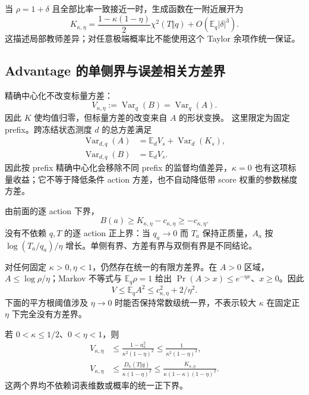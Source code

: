 \documentclass[lang=cn,scheme=chinese,openany]{../book/elegantbook}
\newcommand{\E}{\mathbb E}
\newcommand{\Var}{\operatorname{Var}}
\begin{document}
当 $\rho=1+\delta$ 且全部比率一致接近一时，生成函数在一附近展开为
\begin{equation}
 K_{\kappa,\eta}
 =\frac{1-\kappa(1-\eta)}2\chi^2(T\Vert q)
  +O(\E_q|\delta|^3).
\end{equation}
这描述局部教师差异；对任意极端概率比不能使用这个 Taylor 余项作统一保证。
\subsection{Advantage 的单侧界与误差相关方差界}

精确中心化不改变标量方差：
\begin{equation}
 V_{\kappa,\eta}:=\Var_q(B)=\Var_q(A).
\end{equation}
因此 $K$ 使均值归零，但标量方差的改变来自 $A$ 的形状变换。 这里限定为固定 prefix。跨冻结状态测度 $d$ 的总方差满足
\begin{align}
 \Var_{d,q}(A)&=\E_dV_s+\Var_d(K_s),\\
 \Var_{d,q}(B)&=\E_dV_s.
\end{align}
因此按 prefix 精确中心化会移除不同 prefix 的监督均值差异，$\kappa=0$ 也有这项标量收益；它不等于降低条件 action 方差，也不自动降低带 score 权重的参数梯度方差。

由前面的逐 action 下界，
\begin{equation}
 B(a)\ge K_{\kappa,\eta}-c_{\kappa,\eta}\ge-c_{\kappa,\eta}.
\end{equation}
没有不依赖 $q,T$ 的逐 action 正上界：当 $q_a\to0$ 而 $T_a$ 保持正质量，$A_a$ 按 $\log(T_a/q_a)/\eta$ 增长。单侧有界、方差有界与双侧有界是不同结论。

对任何固定 $\kappa>0,\eta<1$，仍然存在统一的有限方差界。在 $A>0$ 区域，$A\le\log\rho/\eta$；Markov 不等式与 $\E_q\rho=1$ 给出 $\Pr(A>x)\le e^{-\eta x}$、$x\ge0$。因此
\begin{equation}
 V\le\E_qA^2\le c_{\kappa,\eta}^2+2/\eta^2.
\end{equation}
下面的平方根阈值涉及 $\eta\to0$ 时能否保持常数级统一界，不表示较大 $\kappa$ 在固定正 $\eta$ 下完全没有方差界。

\begin{theorem}
\label{thm:center-advantage-variance}
若 $0<\kappa\le1/2$、$0<\eta<1$，则
\begin{align}
 V_{\kappa,\eta}
 &\le\frac{1-a_\kappa^2}{\kappa^2(1-\eta)^2}
 \le\frac1{\kappa^2(1-\eta)^2},\\
 V_{\kappa,\eta}
 &\le\frac{D_\kappa(T\Vert q)}{\kappa(1-\eta)^2}
 \le\frac{K_{\kappa,\eta}}{\kappa(1-\kappa)(1-\eta)^2}.
 \label{eq:center-error-scaled-variance}
\end{align}
这两个界均不依赖词表维数或概率的统一正下界。
\end{theorem}
\end{document}
